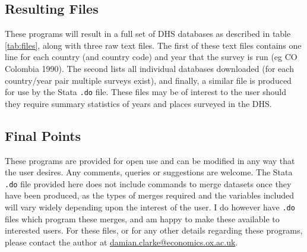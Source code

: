\documentclass{article}[11pt,subeqn]
\begin{document}
\begin{spacing}{1.25}
\subsection{Resulting Files}
These programs will result in a full set of DHS databases as described in table \ref{tab:files}, along with 
three raw text files.  The first of these text files contains one line for each country (and country code) and 
year that the survey is run (eg CO Colombia 1990).  The second lists all individual databases downloaded (for 
each country/year pair multiple surveys exist), and finally, a similar file is produced for use by the Stata
\texttt{.do} file.  These files may be of interest to the user should they require summary statistics of years
and places surveyed in the DHS.

\subsection{Final Points}
These programs are provided for open use and can be modified in any way that the user desires.  Any comments, 
queries or suggestions are welcome.  The Stata \texttt{.do} file provided here does not include commands to 
merge datasets once they have been produced, as the types of merges required and the variables included will 
vary widely depending upon the interest of the user.  I do however have \texttt{.do} files which program these 
merges, and am happy to make these available to interested users.  For these files, or for any other details 
regarding these programs, please contact the author at
\href{mailto:damian.clarke@economics.ox.ac.uk}{damian.clarke@economics.ox.ac.uk}.  




\end{spacing}
\end{document}

